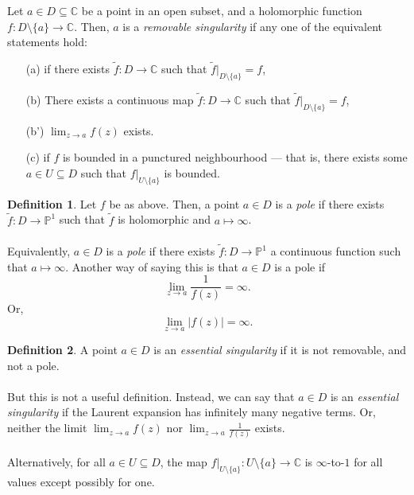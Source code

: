 \documentclass[a4paper]{report}
\theoremstyle{definition}
\newtheorem{definition}{Definition}
\theoremstyle{remark}
\theoremstyle{proposition}
\theoremstyle{conjecture}
\theoremstyle{lemma}
\theoremstyle{corollary}
\theoremstyle{exercise}
\theoremstyle{example}
\newcommand{\C}{\mathbb{C}}
\begin{document}
Let $a \in D \subseteq \C$ be a point in an open subset, and a holomorphic 
function $f : D\setminus \lbrace a\rbrace \to \C$. Then, 
$a$ is a \emph{removable singularity} if any one of the equivalent 
statements hold:
\begin{itemize}
    \item[(a)] if there exists $\widetilde{f} : D \to \C$ such that 
        $\widetilde{f}\vert_{D \setminus \lbrace a\rbrace} = f$,
    \item[(b)] There exists a continuous map $\widetilde{f}:D \to \C$ 
        such that $\widetilde{f}\vert_{D\setminus \lbrace a \rbrace} = f$,
    \item[(b')] $\lim_{z\to a}f(z)$ exists.
    \item[(c)] if $f$ is bounded in a punctured neighbourhood --- 
        that is, there exists some $a \in U \subseteq D$ such that 
        $f\vert_{U\setminus \lbrace a \rbrace}$ is bounded.
\end{itemize}

\begin{definition}
    Let $f$ be as above. Then, a point $a \in D$ is a \emph{pole} if 
    there exists $\widetilde{f} : D \to \mathbb{P}^1$ such that $\widetilde{f}$ 
    is holomorphic and $a \mapsto \infty$.\\\\
    Equivalently, $a\in D$ is a \emph{pole} if there exists 
    $\widetilde{f} : D \to \mathbb{P}^1$ a 
    continuous function such that $a \mapsto \infty$.
    Another way of saying this is that $a\in D$ is a pole if 
    $$\lim_{z\to a} \frac{1}{f(z)} = \infty.$$
    Or, $$\lim_{z\to a}\vert f(z) \vert = \infty.$$
\end{definition}

\begin{definition}
    A point $a \in D$ is an \emph{essential singularity} if 
    it is not removable, and not a pole. \\\\
    But this is not a useful definition. Instead, we can say that 
    $a \in D$ is an \emph{essential singularity} if the Laurent 
    expansion has infinitely many negative terms. Or, 
    neither the limit $\lim_{z\to a} f(z)$ nor $\lim_{z\to a}\frac{1}{f(z)}$
    exists. \\\\
    Alternatively, for all $a \in U \subseteq D$, the map 
    $f\vert_{U\setminus \lbrace a\rbrace} : U\setminus \lbrace a\rbrace\to \C$
    is $\infty$-to-$1$ for all values except possibly for one.
\end{definition}
\end{document}
